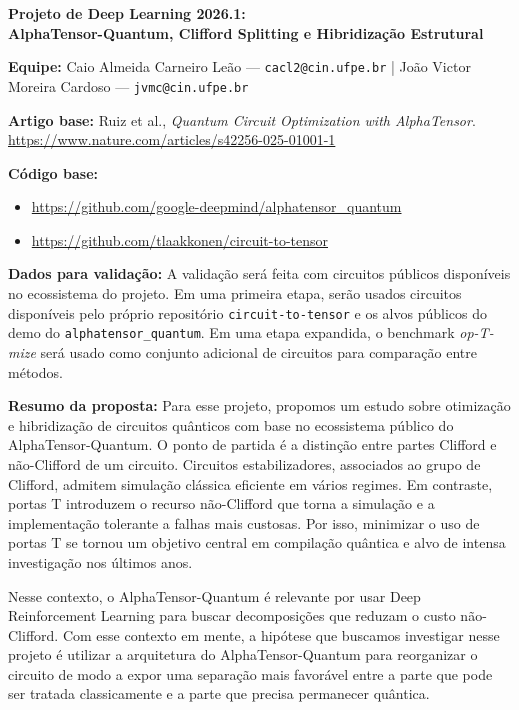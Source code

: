 \documentclass[11pt,a4paper]{article}
\begin{document}
\small

{\Large\bfseries Projeto de Deep Learning 2026.1:\\AlphaTensor-Quantum, Clifford Splitting e Hibridização Estrutural}

\vspace{0.7em}

\textbf{Equipe:} Caio Almeida Carneiro Leão --- \texttt{cacl2@cin.ufpe.br} \quad | \quad João Victor Moreira Cardoso --- \texttt{jvmc@cin.ufpe.br}

\textbf{Artigo base:} Ruiz et al., \emph{Quantum Circuit Optimization with AlphaTensor}. \url{https://www.nature.com/articles/s42256-025-01001-1}

\textbf{Código base:}
\begin{itemize}
  \item \url{https://github.com/google-deepmind/alphatensor_quantum}
  \item \url{https://github.com/tlaakkonen/circuit-to-tensor}
\end{itemize}

\textbf{Dados para validação:} A validação será feita com circuitos públicos disponíveis no ecossistema do projeto. Em uma primeira etapa, serão usados circuitos disponíveis pelo próprio repositório \texttt{circuit-to-tensor} e os alvos públicos do demo do \texttt{alphatensor\_quantum}. Em uma etapa expandida, o benchmark \emph{op-T-mize} será usado como conjunto adicional de circuitos para comparação entre métodos.

\textbf{Resumo da proposta:} Para esse projeto, propomos um estudo sobre otimização e hibridização de circuitos quânticos com base no ecossistema público do AlphaTensor-Quantum. O ponto de partida é a distinção entre partes Clifford e não-Clifford de um circuito. Circuitos estabilizadores, associados ao grupo de Clifford, admitem simulação clássica eficiente em vários regimes. Em contraste, portas T introduzem o recurso não-Clifford que torna a simulação e a implementação tolerante a falhas mais custosas. Por isso, minimizar o uso de portas T se tornou um objetivo central em compilação quântica e alvo de intensa investigação nos últimos anos.

Nesse contexto, o AlphaTensor-Quantum é relevante por usar Deep Reinforcement Learning para buscar decomposições que reduzam o custo não-Clifford. Com esse contexto em mente, a hipótese que buscamos investigar nesse projeto é utilizar a arquitetura do AlphaTensor-Quantum para reorganizar o circuito de modo a expor uma separação mais favorável entre a parte que pode ser tratada classicamente e a parte que precisa permanecer quântica.
\end{document}
